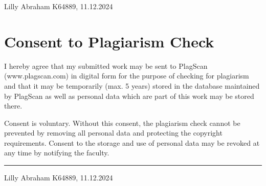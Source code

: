 \documentclass[a4paper,12pt]{article}
\begin{document}
\begin{center}
    Lilly Abraham K64889, 11.12.2024 %
\end{center}

\newpage 

\section*{Consent to Plagiarism Check}

\vspace{1cm}

\noindent I hereby agree that my submitted work may be sent to PlagScan (www.plagscan.com) in digital form for the purpose of checking for plagiarism and that it may be temporarily (max. 5 years) stored in the database maintained by PlagScan as well as personal data which are part of this work may be stored there.

\vspace{0.5cm}

\noindent Consent is voluntary. Without this consent, the plagiarism check cannot be prevented by removing all personal data and protecting the copyright requirements. Consent to the storage and use of personal data may be revoked at any time by notifying the faculty.


\vspace{3cm}
\hfill\rule{15cm}{0.4pt} %

\begin{center}
    Lilly Abraham K64889, 11.12.2024 %
\end{center}
\end{document}
